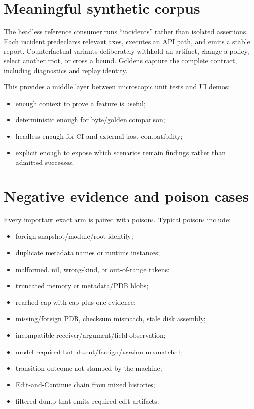 \documentclass[11pt,oneside,openany]{book}
\begin{document}
\section{Meaningful synthetic corpus}

The headless reference consumer runs ``incidents'' rather than isolated assertions. Each incident predeclares relevant axes, executes an API path, and emits a stable report. Counterfactual variants deliberately withhold an artifact, change a policy, select another root, or cross a bound. Goldens capture the complete contract, including diagnostics and replay identity.

This provides a middle layer between microscopic unit tests and UI demos:

\begin{itemize}
  \item enough context to prove a feature is useful;
  \item deterministic enough for byte/golden comparison;
  \item headless enough for CI and external-host compatibility;
  \item explicit enough to expose which scenarios remain findings rather than admitted successes.
\end{itemize}

\section{Negative evidence and poison cases}

Every important exact arm is paired with poisons. Typical poisons include:

\begin{itemize}
  \item foreign snapshot/module/root identity;
  \item duplicate metadata names or runtime instances;
  \item malformed, nil, wrong-kind, or out-of-range tokens;
  \item truncated memory or metadata/PDB blobs;
  \item reached cap with cap-plus-one evidence;
  \item missing/foreign PDB, checksum mismatch, stale disk assembly;
  \item incompatible receiver/argument/field observation;
  \item model required but absent/foreign/version-mismatched;
  \item transition outcome not stamped by the machine;
  \item Edit-and-Continue chain from mixed histories;
  \item filtered dump that omits required edit artifacts.
\end{itemize}
\end{document}
